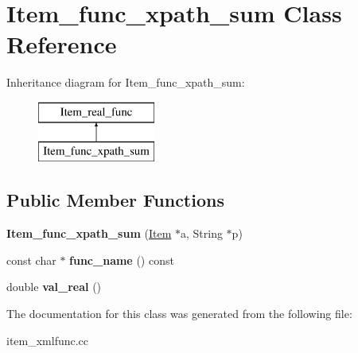 \hypertarget{classItem__func__xpath__sum}{}\section{Item\+\_\+func\+\_\+xpath\+\_\+sum Class Reference}
\label{classItem__func__xpath__sum}
Inheritance diagram for Item\+\_\+func\+\_\+xpath\+\_\+sum\+:\begin{figure}[H]
\begin{center}
\leavevmode
\includegraphics[height=2.000000cm]{classItem__func__xpath__sum}
\end{center}
\end{figure}
\subsection*{Public Member Functions}
\begin{DoxyCompactItemize}
\item 
\mbox{\label{classItem__func__xpath__sum_af274868a2dcf4a6f39f714a33b81fd41}} 
{\bfseries Item\+\_\+func\+\_\+xpath\+\_\+sum} (\mbox{\hyperlink{classItem}{Item}} $\ast$a, String $\ast$p)
\item 
\mbox{\label{classItem__func__xpath__sum_a60836906ee7465aef914f21d2d2d676b}} 
const char $\ast$ {\bfseries func\+\_\+name} () const
\item 
\mbox{\label{classItem__func__xpath__sum_aad9daaa251910d42e519f44be3d9e7cc}} 
double {\bfseries val\+\_\+real} ()
\end{DoxyCompactItemize}


The documentation for this class was generated from the following file\+:\begin{DoxyCompactItemize}
\item 
item\+\_\+xmlfunc.\+cc\end{DoxyCompactItemize}
